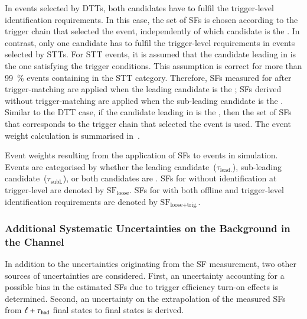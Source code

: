 In events selected by DTTs, both \tauhadvis candidates have to fulfil the
trigger-level identification requirements. In this case, the set of SFs is
chosen according to the trigger chain that selected the event, independently of
which \tauhadvis candidate is the \faketauhadvis. In contrast, only one
\tauhadvis candidate has to fulfil the trigger-level requirements in events
selected by STTs. For STT events, it is assumed that the \tauhadvis candidate
leading in \pT is the one satisfying the trigger conditions. This assumption is
correct for more than \SI{99}{\percent} \ttbar events containing \faketauhadvis
in the STT category. Therefore, SFs measured for \faketauhadvis after
trigger-matching are applied when the leading \tauhadvis candidate is the
\faketauhadvis; SFs derived without trigger-matching are applied when the
sub-leading \tauhadvis candidate is the \faketauhadvis. Similar to the DTT case,
if the \tauhadvis candidate leading in \pT is the \faketauhadvis, then the set
of SFs that corresponds to the trigger chain that selected the event is
used. The event weight calculation is summarised
in~.

\begin{table}[htbp]
  \centering

  \caption{Event weights resulting from the application of SFs to \ttbarFakes
    events in simulation. Events are categorised by whether the leading
    \tauhadvis candidate~($\tau_{\text{lead.}}$), sub-leading \tauhadvis
    candidate~($\tau_{\text{subl.}}$), or both \tauhadvis candidates are
    \faketauhadvis. SFs for \faketauhadvis without identification at
    trigger-level are denoted by $\text{SF}_{\text{loose}}$. SFs for
    \faketauhadvis with both offline and trigger-level identification
    requirements are denoted by $\text{SF}_\text{loose+trig.}$.}%
  \label{tab:ttbarSF_application_rule}

  \resizebox{\textwidth}{!}{
    
  }
\end{table}


\subsubsection{Additional Systematic Uncertainties on the \ttbarFakes Background
  in the \hadhad Channel}

In addition to the uncertainties originating from the SF measurement, two other
sources of uncertainties are considered. First, an uncertainty accounting for a
possible bias in the estimated SFs due to trigger efficiency turn-on effects is
determined. Second, an uncertainty on the extrapolation of the measured SFs from
$\ell + \tau_{\text{had}}$ final states to \hadhad final states is derived.

